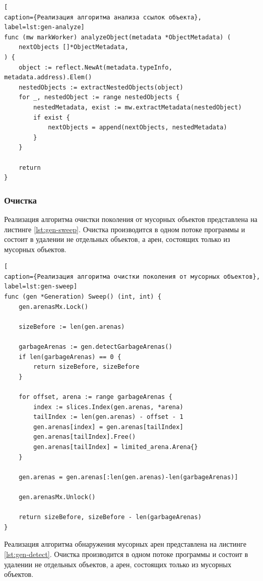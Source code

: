 \begin{lstlisting}[
caption={Реализация алгоритма анализа ссылок объекта},
label=lst:gen-analyze]
func (mw markWorker) analyzeObject(metadata *ObjectMetadata) (
	nextObjects []*ObjectMetadata,
) {
	object := reflect.NewAt(metadata.typeInfo, metadata.address).Elem()
	nestedObjects := extractNestedObjects(object)
	for _, nestedObject := range nestedObjects {
		nestedMetadata, exist := mw.extractMetadata(nestedObject)
		if exist {
			nextObjects = append(nextObjects, nestedMetadata)
		}
	}
	
	return
}
\end{lstlisting}



\subsubsection{Очистка}

Реализация алгоритма очистки поколения от мусорных объектов представлена на листинге \ref{lst:gen-sweep}. Очистка производится в одном потоке программы и состоит в удалении не отдельных объектов, а арен, состоящих только из мусорных объектов.

\begin{lstlisting}[
caption={Реализация алгоритма очистки поколения от мусорных объектов},
label=lst:gen-sweep]
func (gen *Generation) Sweep() (int, int) {
	gen.arenasMx.Lock()
	
	sizeBefore := len(gen.arenas)
	
	garbageArenas := gen.detectGarbageArenas()
	if len(garbageArenas) == 0 {
		return sizeBefore, sizeBefore
	}
	
	for offset, arena := range garbageArenas {
		index := slices.Index(gen.arenas, *arena)
		tailIndex := len(gen.arenas) - offset - 1
		gen.arenas[index] = gen.arenas[tailIndex]
		gen.arenas[tailIndex].Free()
		gen.arenas[tailIndex] = limited_arena.Arena{}
	}
	
	gen.arenas = gen.arenas[:len(gen.arenas)-len(garbageArenas)]
	
	gen.arenasMx.Unlock()
	
	return sizeBefore, sizeBefore - len(garbageArenas)
}
\end{lstlisting}

Реализация алгоритма обнаружения мусорных арен представлена на листинге \ref{lst:gen-detect}. Очистка производится в одном потоке программы и состоит в удалении не отдельных объектов, а арен, состоящих только из мусорных объектов.

